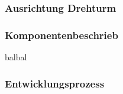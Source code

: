 \subsubsection{Ausrichtung Drehturm}
\subsubsection*{Komponentenbeschrieb}

balbal

\subsubsection*{Entwicklungsprozess}
